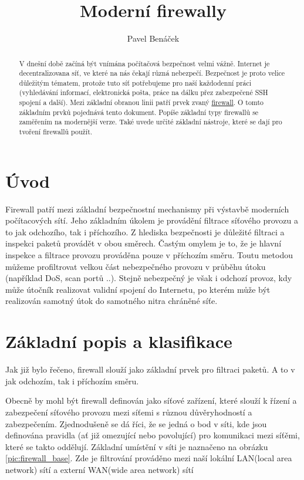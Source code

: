 \documentclass[11pt,twoside,a4paper]{article}
\title{Moderní firewally}
\author{Pavel Benáček}
\begin{document}
\maketitle

\begin{abstract}

V dnešní době začíná být vnímána počítačová bezpečnost velmi vážně. Internet je decentralizovana síť, ve které na nás čekají různá nebezpečí. Bezpečnost je proto velice důležitým tématem, protože tuto síť potřebujeme pro naší každodenní práci (vyhledávání informací, elektronická pošta, práce na dálku přez zabezpečené SSH spojení a další). Mezi základní obranou linii patří prvek zvaný \underline{firewall}. O tomto základním prvků pojednává tento dokument. Popíše základní typy firewallů se zaměřením na modernější verze. Také uvede určité základní nástroje, které se dají pro tvoření firewallů použít.
\end{abstract}

\tableofcontents

\section{Úvod}

Firewall patří mezi základní bezpečnostní mechanismy při výstavbě moderních počítacových sítí. Jeho základním úkolem je provádění filtrace síťového provozu a to jak odchozího, tak i příchozího. Z hlediska bezpečnosti je důležité filtraci a inspekci paketů provádět v obou směrech. Častým omylem je to, že je hlavní inspekce a filtrace provozu prováděna pouze v příchozím směru. Toutu metodou můžeme profiltrovat velkou část nebezpečného provozu v průběhu útoku (například DoS, scan portů ..). Stejně nebezpečný je však i odchozí provoz, kdy může útočník realizovat validní spojení do Internetu, po kterém může být realizován samotný útok do samotného nitra chráněné síťe.
 
\section{Základní popis a klasifikace}\label{sec:defend} 

Jak již bylo řečeno, firewall slouží jako základní prvek pro filtraci paketů. A to v jak odchozím, tak i příchozím směru.

Obecně by mohl být firewall definován jako síťové zařízení, které slouží k řízení a zabezpečení síťového provozu mezi síťemi s různou důvěryhodností a zabezpečením. Zjednodušeně se dá říci, že se jedná o bod v síti, kde jsou definována pravidla (ať již omezující nebo povolující) pro komunikaci mezi síťěmi, které se takto oddělují. Základní umístění v síti je naznačeno na obrázku \ref{pic:firewall_base}. Zde je filtrování prováděno mezi naší lokální LAN(local area network) sítí a externí WAN(wide area network) sítí
\end{document}
